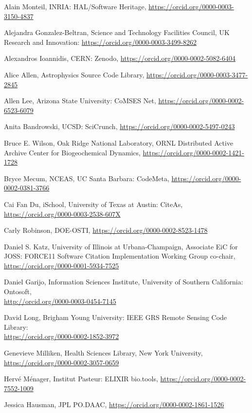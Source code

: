 \documentclass[11pt]{article}
\begin{document}
\begin{spacing}{0.86}

Alain Monteil, INRIA: HAL/Software Heritage,
\url{https://orcid.org/0000-0003-3150-4837}

Alejandra Gonzalez-Beltran, Science and Technology Facilities Council,
UK Research and Innovation:
\url{https://orcid.org/0000-0003-3499-8262}

Alexandros Ioannidis, CERN: Zenodo,
\url{https://orcid.org/0000-0002-5082-6404}

Alice Allen, Astrophysics Source Code Library,
\url{https://orcid.org/0000-0003-3477-2845}

Allen Lee, Arizona State University: CoMSES Net,
\url{https://orcid.org/0000-0002-6523-6079}

Anita Bandrowski, UCSD: SciCrunch,
\url{https://orcid.org/0000-0002-5497-0243}

Bruce E. Wilson, Oak Ridge National Laboratory, ORNL Distributed Active
Archive Center for Biogeochemical Dynamics,
\url{https://orcid.org/0000-0002-1421-1728}

Bryce Mecum, NCEAS, UC Santa Barbara: CodeMeta,
\url{https://orcid.org/0000-0002-0381-3766}

Cai Fan Du, iSchool, University of Texas at Austin: CiteAs,
\url{https://orcid.org/0000-0003-2538-607X}

Carly Robinson, DOE-OSTI,
\url{https://orcid.org/0000-0002-8523-1478}

Daniel S. Katz, University of Illinois at Urbana-Champaign, Associate
EiC for JOSS: FORCE11 Software Citation Implementation Working Group
co-chair,
\url{https://orcid.org/0000-0001-5934-7525}

Daniel Garijo, Information Sciences Institute, University of Southern
California: Ontosoft,\\
\url{http://orcid.org/0000-0003-0454-7145}

David Long, Brigham Young University: IEEE GRS Remote Sensing Code
Library:\\
\url{https://orcid.org/0000-0002-1852-3972}

Genevieve Milliken, Health Sciences Library, New York University,
\url{https://orcid.org/0000-0002-3057-0659}

Hervé Ménager, Institut Pasteur: ELIXIR bio.tools,
\url{https://orcid.org/0000-0002-7552-1009}

Jessica Hausman, JPL PO.DAAC,
\url{https://orcid.org/0000-0002-1861-1526}


\end{spacing}
\end{document}
